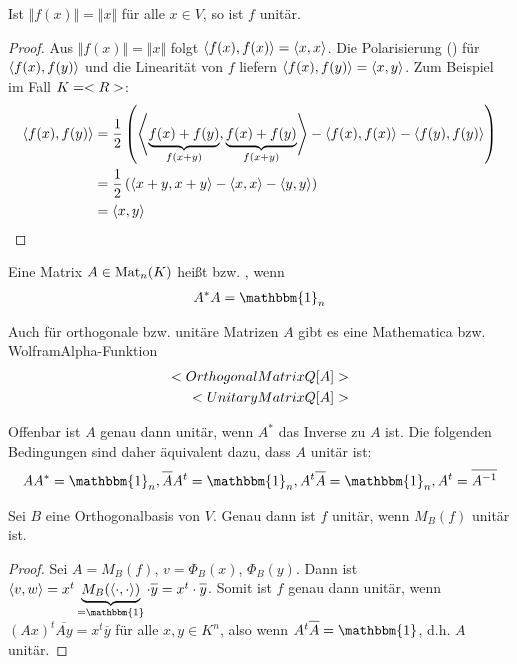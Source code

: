 \begin{proposition}
	Ist $\Vert f(x)\Vert=\Vert x\Vert$ für alle $x\in V$, so ist $f$ unitär.
\end{proposition}
\begin{proof}
	Aus $\Vert f(x)\Vert=\Vert x\Vert$ folgt $\skalar{f(x)}{f(x)}=\skalar{x}{x}$. Die Polarisierung () für $\skalar{f(x)}{f(y)}$ und die Linearität von $f$ liefern $\skalar{f(x)}{f(y)}=\skalar{x}{y}$. Zum Beispiel im Fall $K=\real$:
	\begin{align}
		\skalar{f(x)}{f(y)}&=\frac 1 2 \left(\skalar{\underbrace{f(x)+f(y)}_{f(x+y)}} {\underbrace{f(x)+f(y)}_{f(x+y)}}-\skalar{f(x)}{f(x)}-\skalar{f(y)}{f(y)}\right) \notag \\
		&= \frac 1 2 \left( \skalar{x+y}{x+y}-\skalar{x}{x}-\skalar{y}{y}\right) \notag \\
		&= \skalar{x}{y}\notag
	\end{align}
\end{proof}

\begin{definition}
	Eine Matrix $A\in\Mat_n(K)$ heißt  bzw. , wenn
	\begin{align}
		A^*A=\mathbbm{1}_n\notag
	\end{align}
\end{definition}

\begin{mathematica}
 	Auch für orthogonale bzw. unitäre Matrizen $A$ gibt es eine Mathematica bzw. WolframAlpha-Funktion
 	\begin{align}
 		\texttt{OrthogonalMatrixQ[A]}\notag \\
 		\texttt{UnitaryMatrixQ[A]}\notag
 	\end{align}
\end{mathematica}

\begin{remark}
	Offenbar ist $A$ genau dann unitär, wenn $A^*$ das Inverse zu $A$ ist. Die folgenden Bedingungen sind daher äquivalent dazu, dass $A$ unitär ist:
	\begin{align}
		AA^*=\mathbbm{1}_n, \overline{A}A^t=\mathbbm{1}_n,  A^t\overline{A}=\mathbbm{1}_n,  A^t=\overline{A^{-1}}\notag
	\end{align}
\end{remark}

\begin{proposition}
	Sei $B$ eine Orthogonalbasis von $V$. Genau dann ist $f$ unitär, wenn $M_B(f)$ unitär ist.
\end{proposition}
\begin{proof}
	Sei $A=M_B(f)$, $v=\Phi_B(x)$, $\Phi_B(y)$. Dann ist $\skalar{v}{w}=x^t\underbrace{M_B(\skalar{\cdot}{\cdot})}_{=\mathbbm{1}}\cdot \overline{y}=x^t\cdot \overline{y}$. Somit ist $f$ genau dann unitär, wenn $(Ax)^t\overline{Ay}=x^t\overline{y}$ für alle $x,y\in K^n$, also wenn $A^t\overline{A}=\mathbbm{1}$, d.h. $A$ unitär.
\end{proof}

